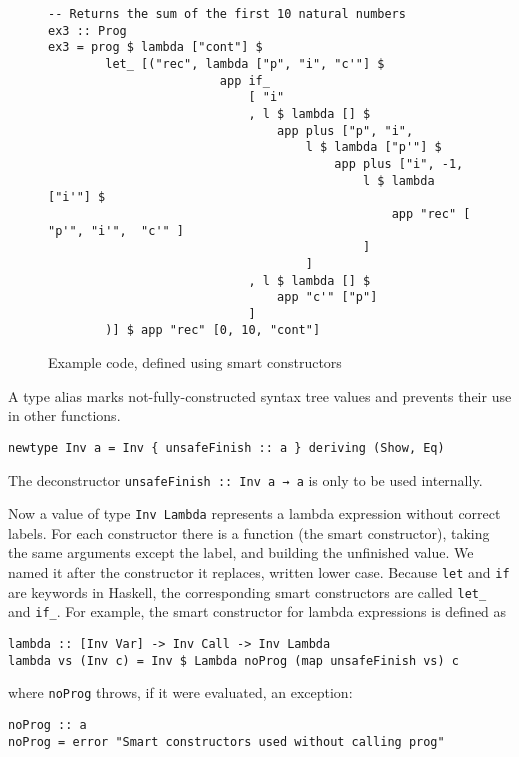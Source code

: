 \documentclass[a4paper,parskip=half,BCOR=8mm,DIV=calc,12pt]{scrbook}
\begin{document}
\begin{figure}
\begin{framed}
\centering
\begin{lstlisting}
-- Returns the sum of the first 10 natural numbers            
ex3 :: Prog
ex3 = prog $ lambda ["cont"] $
        let_ [("rec", lambda ["p", "i", "c'"] $
                        app if_
                            [ "i"
                            , l $ lambda [] $
                                app plus ["p", "i",
                                    l $ lambda ["p'"] $
                                        app plus ["i", -1,
                                            l $ lambda ["i'"] $
                                                app "rec" [ "p'", "i'",  "c'" ]
                                            ]
                                    ]
                            , l $ lambda [] $
                                app "c'" ["p"]
                            ]
        )] $ app "rec" [0, 10, "cont"]
\end{lstlisting}
\end{framed}
\caption{Example code, defined using smart constructors}
\label{fig:sum10}
\end{figure}

A type alias marks not-fully-constructed syntax tree values and prevents their use in other functions.
\begin{lstlisting}
newtype Inv a = Inv { unsafeFinish :: a } deriving (Show, Eq)
\end{lstlisting}
The deconstructor \lstinline!unsafeFinish :: Inv a → a! is only to be used internally.

Now a value of type \lstinline-Inv Lambda- represents a lambda expression without correct labels. For each constructor there is a function (the smart constructor), taking the same arguments except the label, and building the unfinished value. We named it after the constructor it replaces, written lower case. Because \lstinline-let- and \lstinline-if- are keywords in Haskell, the corresponding smart constructors are called \lstinline-let_- and \lstinline-if_-. For example, the smart constructor for lambda expressions is defined as
\begin{lstlisting}
lambda :: [Inv Var] -> Inv Call -> Inv Lambda
lambda vs (Inv c) = Inv $ Lambda noProg (map unsafeFinish vs) c
\end{lstlisting}
where \lstinline!noProg! throws, if it were evaluated, an exception:
\begin{lstlisting}
noProg :: a
noProg = error "Smart constructors used without calling prog"
\end{lstlisting}
\end{document}
